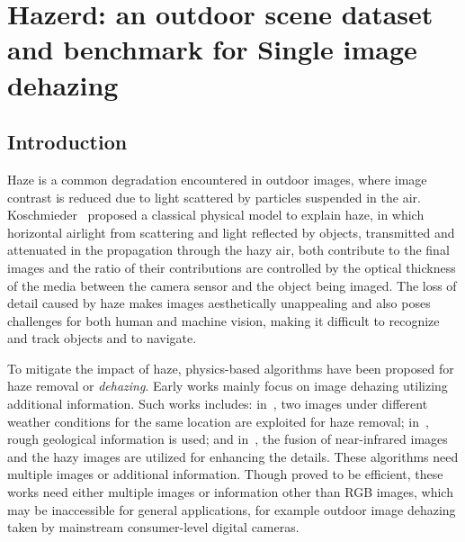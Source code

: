 \chapter{Hazerd: an outdoor scene dataset and benchmark for Single image dehazing}
\label{cha3}

\section{Introduction}
\label{sec:3.1.intro}
Haze is a common degradation encountered in outdoor images, where image contrast is reduced due to light scattered by particles suspended in the air. Koschmieder~\cite{Koschmieder24,McCartney76} proposed a classical physical model to explain haze, in which horizontal airlight from scattering and light reflected by objects, transmitted and attenuated in the propagation through the hazy air, both contribute to the final images and the ratio of their contributions are controlled by the optical thickness of the media between the camera sensor and the object being imaged. The loss of detail caused by haze makes images aesthetically unappealing and also poses challenges for both human and machine vision, making it difficult to recognize and track objects and to navigate.

To mitigate the impact of haze, physics-based algorithms have been proposed for haze removal or {\em dehazing}. Early works mainly focus on image dehazing utilizing additional information. Such works includes: in~\cite{narasimhan2003contrast}, two images under different weather conditions for the same location are exploited for haze removal; in~\cite{kopf2008deep}, rough geological information is used; and in~\cite{schaul2009color}, the fusion  of near-infrared images and the hazy images are utilized for enhancing the details. These algorithms need multiple images or additional information. Though proved to be efficient, these works need either multiple images or information other than RGB images, which may be inaccessible for general applications, for example outdoor image dehazing taken by mainstream consumer-level digital cameras.

